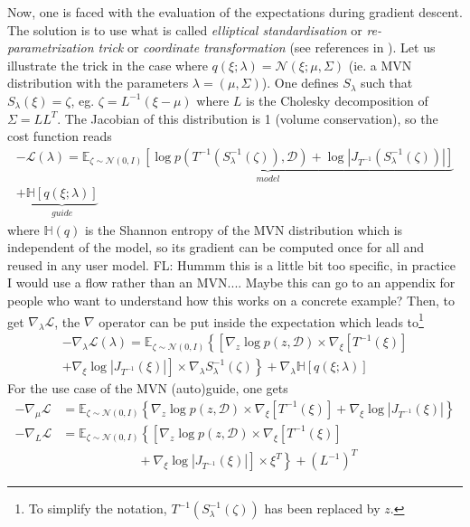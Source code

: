 \documentclass[twocolumn,twocolappendix,nofootinbib,iop]{openjournal}
\newcommand{\FrL}[1]{{\color{cyan}FL: #1}}
\newcommand{\nn}{\nonumber}
\begin{document}
Now, one is faced with the evaluation of the expectations during gradient descent. The solution is to use what is called \textit{elliptical standardisation} or \textit{re-parametrization trick} or \textit{coordinate transformation} (see references in \citep{2015arXiv150603431K}). Let us illustrate the trick in the case where $q(\xi; \lambda) = \mathcal{N}(\xi; \mu, \Sigma)$ (ie. a MVN distribution with the parameters $\lambda=(\mu, \Sigma)$). One defines $S_\lambda$ such that $S_\lambda(\xi)=\zeta$, eg. $\zeta = L^{-1}(\xi-\mu)$ where $L$ is the Cholesky decomposition of $\Sigma=LL^T$. The Jacobian of this distribution is 1 (volume conservation), so the cost function reads
\begin{multline}
-\mathcal{L}(\lambda) = \underbrace{\mathbb{E}_{\zeta\sim \mathcal{N}(0,I)}\left[ \log p(T^{-1}(S_\lambda^{-1}(\zeta)),\mathcal{D}) + \log |J_{T^{-1}}(S_\lambda^{-1}(\zeta))| \right]}_{model} \\ + \underbrace{\mathbb{H}[q(\xi;\lambda)]}_{guide}
\label{eq-loss-svi-3}
\end{multline}
where $\mathbb{H}(q)$ is the Shannon entropy of the MVN distribution which is independent of the model, so its gradient can be computed once for all and reused in any user model. \FrL{Hummm this is a little bit too specific, in practice I would use a flow rather than an MVN.... Maybe this can go to an appendix for people who want to understand how this works on a concrete example?} Then,
to get $\nabla_\lambda \mathcal{L}$, the $\nabla$ operator can be put inside the expectation which leads to\footnote{To simplify the notation, $T^{-1}(S_\lambda^{-1}(\zeta))$ has been replaced by $z$.}
\begin{multline}
-\nabla_\lambda\mathcal{L}(\lambda) = \mathbb{E}_{\zeta\sim \mathcal{N}(0,I)}\left\{
\left[ \nabla_z \log p(z,\mathcal{D}) \times \nabla_\xi[T^{-1}(\xi)] \right. \right. \\
+ \left. \left. \nabla_\xi \log|J_{T^{-1}}(\xi)| \right] \times \nabla_\lambda S_\lambda^{-1}(\zeta)
\right\}
+ \nabla_\lambda \mathbb{H}[q(\xi;\lambda)]
\label{eq-loss-svi-4}
\end{multline}
For the use case of the MVN (auto)guide, one gets
\begin{align}
-\nabla_\mu \mathcal{L} &= \mathbb{E}_{\zeta\sim \mathcal{N}(0,I)}\left\{
\nabla_z \log p(z,\mathcal{D}) \times \nabla_\xi[T^{-1}(\xi)]
+ \nabla_\xi \log|J_{T^{-1}}(\xi)|
\right\} \nn \\
-\nabla_L \mathcal{L} &= \mathbb{E}_{\zeta\sim \mathcal{N}(0,I)}\left\{
\left[ \nabla_z \log p(z,\mathcal{D}) \times \nabla_\xi[T^{-1}(\xi)] \right.\right. \nn\\
&\left. \left. \qquad\qquad\qquad + \nabla_\xi \log|J_{T^{-1}}(\xi)| \right] \times \xi^T 
\right\}+ (L^{-1})^T
\end{align}
\end{document}
